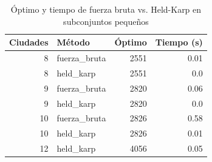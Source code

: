 \begin{table}[H]
\centering
\renewcommand{\arraystretch}{1.3}
\begin{tabular}{|r|l|r|r|}
\hline
Ciudades & Método & Óptimo & Tiempo (s) \\
\hline
8 & fuerza\_bruta & 2551 & 0.01 \\
8 & held\_karp & 2551 & 0.0 \\
9 & fuerza\_bruta & 2820 & 0.06 \\
9 & held\_karp & 2820 & 0.0 \\
10 & fuerza\_bruta & 2826 & 0.58 \\
10 & held\_karp & 2826 & 0.01 \\
12 & held\_karp & 4056 & 0.05 \\
\hline
\end{tabular}
\caption{Óptimo y tiempo de fuerza bruta vs. Held-Karp en subconjuntos pequeños}
\label{tab:exactos}
\end{table}